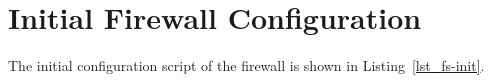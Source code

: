\section{Initial Firewall Configuration}

The initial configuration script of the firewall is shown in
Listing~\ref{lst_fs-init}.


